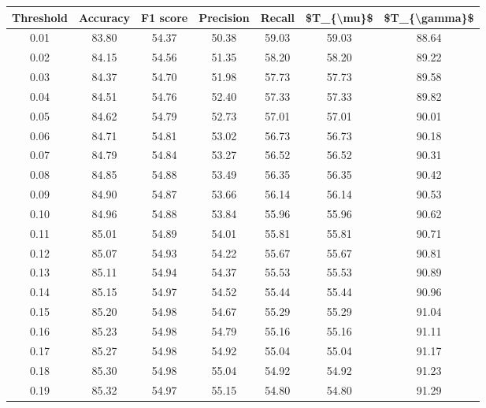\begin{tabular}{|c|c|c|c|c|c|c|}
\hline
 Threshold &  Accuracy &  F1 score &  Precision &  Recall &  \$T\_\{\textbackslash mu\}\$ &  \$T\_\{\textbackslash gamma\}\$ \\
\hline
      0.01 &     83.80 &     54.37 &      50.38 &   59.03 &      59.03 &         88.64 \\
      0.02 &     84.15 &     54.56 &      51.35 &   58.20 &      58.20 &         89.22 \\
      0.03 &     84.37 &     54.70 &      51.98 &   57.73 &      57.73 &         89.58 \\
      0.04 &     84.51 &     54.76 &      52.40 &   57.33 &      57.33 &         89.82 \\
      0.05 &     84.62 &     54.79 &      52.73 &   57.01 &      57.01 &         90.01 \\
      0.06 &     84.71 &     54.81 &      53.02 &   56.73 &      56.73 &         90.18 \\
      0.07 &     84.79 &     54.84 &      53.27 &   56.52 &      56.52 &         90.31 \\
      0.08 &     84.85 &     54.88 &      53.49 &   56.35 &      56.35 &         90.42 \\
      0.09 &     84.90 &     54.87 &      53.66 &   56.14 &      56.14 &         90.53 \\
      0.10 &     84.96 &     54.88 &      53.84 &   55.96 &      55.96 &         90.62 \\
      0.11 &     85.01 &     54.89 &      54.01 &   55.81 &      55.81 &         90.71 \\
      0.12 &     85.07 &     54.93 &      54.22 &   55.67 &      55.67 &         90.81 \\
      0.13 &     85.11 &     54.94 &      54.37 &   55.53 &      55.53 &         90.89 \\
      0.14 &     85.15 &     54.97 &      54.52 &   55.44 &      55.44 &         90.96 \\
      0.15 &     85.20 &     54.98 &      54.67 &   55.29 &      55.29 &         91.04 \\
      0.16 &     85.23 &     54.98 &      54.79 &   55.16 &      55.16 &         91.11 \\
      0.17 &     85.27 &     54.98 &      54.92 &   55.04 &      55.04 &         91.17 \\
      0.18 &     85.30 &     54.98 &      55.04 &   54.92 &      54.92 &         91.23 \\
      0.19 &     85.32 &     54.97 &      55.15 &   54.80 &      54.80 &         91.29 \\

\end{tabular}
